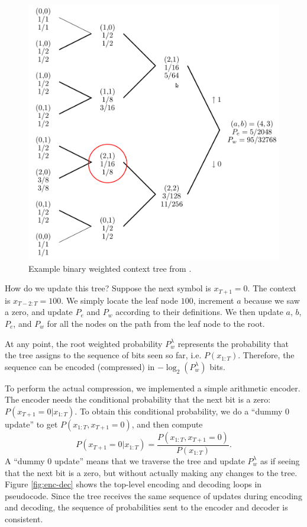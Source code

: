 \documentclass[11pt]{scrartcl}
\begin{document}
\begin{figure}[h!]
    \centering
    \includegraphics[width=12cm]{eidma-fig-3-2-ed.png}
    \caption{Example binary weighted context tree from \textcite{eidma}.}
    \label{fig:bin-tree}
\end{figure}

How do we update this tree? Suppose the next symbol is $x_{T+1} = 0$. The
context is $x_{T-2:T} = 100$. We simply locate the leaf node $100$, increment
$a$ because we saw a zero, and update $P_e$ and $P_w$ according to their
definitions. We then update $a$, $b$, $P_e$, and $P_w$ for all the nodes on the
path from the leaf node to the root.

At any point, the root weighted probability $P_w^\lambda$ represents the
probability that the tree assigns to the sequence of bits seen so far, i.e.
$P(x_{1:T})$. Therefore, the sequence can be encoded (compressed) in
$-\log_2(P_w^\lambda)$ bits.

To perform the actual compression, we implemented a simple arithmetic encoder.
The encoder needs the conditional probability that the next bit is a zero:
$P(x_{T+1} = 0 | x_{1:T})$. To obtain this conditional probability, we do a
``dummy 0 update'' to get $P(x_{1:T}, x_{T+1} = 0)$, and then compute
\[
P(x_{T+1} = 0 | x_{1:T}) = \frac{ P(x_{1:T}, x_{T+1} = 0) }{ P(x_{1:T}) }.
\]
A ``dummy 0 update'' means that we traverse the tree and update $P_w^\lambda$
as if seeing that the next bit is a zero, but without actually making any
changes to the tree. Figure \ref{fig:enc-dec} shows the top-level encoding and
decoding loops in pseudocode. Since the tree receives the same sequence of
updates during encoding and decoding, the sequence of probabilities sent to the
encoder and decoder is consistent.
\end{document}
